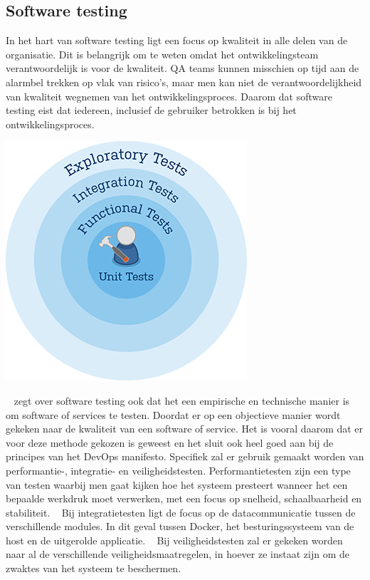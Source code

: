 \subsection{Software testing}
\label{sec:testing-uitleg}
In het hart van software testing ligt een focus op kwaliteit in alle delen van de organisatie. Dit is belangrijk om te weten omdat het ontwikkelingsteam verantwoordelijk is voor de kwaliteit. QA teams kunnen misschien op tijd aan de alarmbel trekken op vlak van risico's, maar men kan niet de verantwoordelijkheid van kwaliteit wegnemen van het ontwikkelingsproces. Daarom dat software testing eist dat iedereen, inclusief de gebruiker betrokken is bij het ontwikkelingsproces. ~\autocite{SoftwareTesting}

\begin{center}
	\includegraphics[scale=0.5]{img/testing.png}
\end{center}

~\textcite{CemKaner2006} zegt over software testing ook dat het een empirische en technische manier is om software of services te testen. Doordat er op een objectieve manier wordt gekeken naar de kwaliteit van een software of service. Het is vooral daarom dat er voor deze methode gekozen is geweest en het sluit ook heel goed aan bij de principes van het DevOps manifesto.
Specifiek zal er gebruik gemaakt worden van performantie-, integratie- en veiligheidstesten.
Performantietesten zijn een type van testen waarbij men gaat kijken hoe het systeem presteert wanneer het een bepaalde werkdruk moet verwerken, met een focus op snelheid, schaalbaarheid en stabiliteit. ~\autocite{PerformanceTesting}
Bij integratietesten ligt de focus op de datacommunicatie tussen de verschillende modules. In dit geval tussen Docker, het besturingssysteem van de host en de uitgerolde applicatie. ~\autocite{IntegrationTesting}
Bij veiligheidstesten zal er gekeken worden naar al de verschillende veiligheidsmaatregelen, in hoever ze instaat zijn om de zwaktes van het systeem te beschermen. ~\autocite{SecurityTesting}

